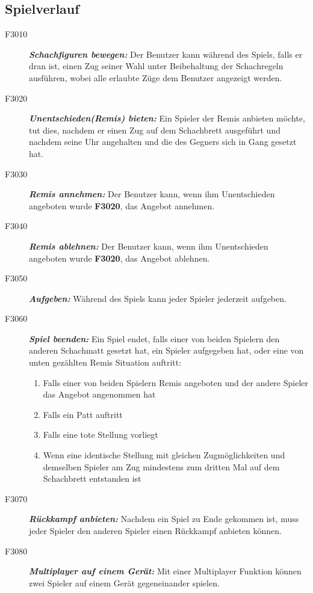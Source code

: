 \documentclass[parskip=full]{scrartcl}
\begin{document}
\subsection{Spielverlauf} 
\begin{description}
	\item[F3010]\textbf{\textit{Schachfiguren bewegen: }}Der Benutzer kann während des Spiels, falls er dran ist, einen Zug seiner Wahl unter Beibehaltung der \gls{Schachregeln} ausführen, wobei alle erlaubte Züge dem Benutzer angezeigt werden.
	\item[F3020] \textbf{\textit{Unentschieden(Remis) bieten: }} Ein Spieler der Remis anbieten möchte, tut dies, nachdem er einen Zug auf dem Schachbrett ausgeführt und nachdem seine Uhr angehalten und die des Gegners sich in Gang gesetzt hat.
	\item[F3030] \textbf{\textit{Remis annehmen: }} Der Benutzer kann, wenn ihm Unentschieden angeboten wurde \textbf{F3020}, das Angebot annehmen.
	
	\item[F3040] \textbf{\textit{Remis ablehnen: }} Der Benutzer kann, wenn ihm Unentschieden angeboten wurde \textbf{F3020}, das Angebot ablehnen.
	
	\item[F3050] \textbf{\textit{Aufgeben: }} Während des Spiels kann jeder Spieler jederzeit aufgeben.
	\item[F3060] \textbf{\textit{Spiel beenden: }} Ein Spiel endet, falls einer von beiden Spielern den anderen Schachmatt gesetzt hat, ein Spieler aufgegeben hat, oder eine von unten gezählten Remis Situation auftritt:
	\begin{enumerate}	    
		\item Falls einer von beiden Spielern Remis angeboten und der andere Spieler das Angebot angenommen hat
		\item Falls ein \gls{Patt} auftritt
		\item Falls eine \gls{tote Stellung} vorliegt
		\item Wenn eine identische Stellung mit gleichen Zugmöglichkeiten und demselben Spieler am Zug mindestens zum dritten Mal auf dem Schachbrett entstanden ist 
	\end{enumerate}
	\item[F3070] \textbf{\textit{Rückkampf anbieten: }} Nachdem ein Spiel zu Ende gekommen ist, muss jeder Spieler den anderen Spieler einen Rückkampf anbieten können.		
	\item[F3080] \textbf{\textit{Multiplayer auf einem Gerät: }}  Mit einer Multiplayer Funktion können zwei Spieler auf einem Gerät gegeneinander spielen.
\end{description}
\newpage
\end{document}
